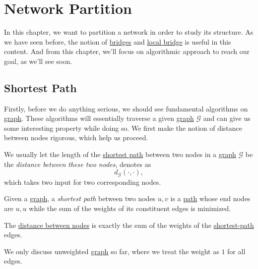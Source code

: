 \chapter{Network Partition}
In this chapter, we want to partition a network in order to study its structure. As we have seen before, the notion of \hyperref[def:bridge]{bridges} and \hyperref[def:local-bridge]{local bridge} is useful in this content. And from this chapter, we'll focus on algorithmic approach to reach our goal, as we'll see soon.

\section{Shortest Path}
Firstly, before we do anything serious, we should see fundamental algorithms on \hyperref[def:graph]{graph}. These algorithms will essentially traverse a given \hyperref[def:graph]{graph} \(\mathcal{G} \) and can give us some interesting property while doing so. We first make the notion of distance between nodes rigorous, which help us proceed.

\begin{definition}\label{def:distance-between-nodes}
	We usually let the length of the \hyperref[def:shortest-path]{shortest path} between two nodes in a \hyperref[def:graph]{graph} \(\mathcal{G}\) be the \emph{distance between these two nodes}, denotes as
	\[
		d_{\mathcal{G}}(\cdot, \cdot),
	\]
	which takes two input for two corresponding nodes.
\end{definition}

\begin{definition}\label{def:shortest-path}
	Given a \hyperref[def:graph]{graph}, a \emph{shortest path} between two nodes \(u, v\) is a \hyperref[def:path]{path} whose end nodes are \(u, u\) while the sum of the weights of its constituent edges is minimized.
\end{definition}

\begin{remark}
	The \hyperref[def:distance-between-nodes]{distance between nodes} is exactly the sum of the weights of the \hyperref[def:shortest-path]{shortest-path} edges.
\end{remark}

\begin{note}
	We only discuss unweighted \hyperref[def:graph]{graph} so far, where we treat the weight as \(1\) for all edges.
\end{note}

